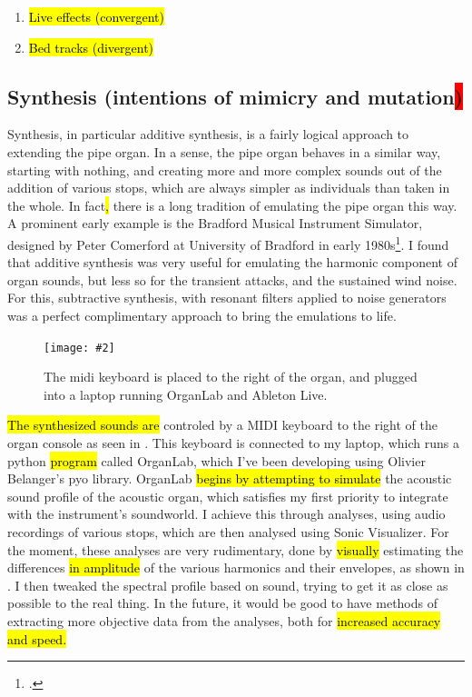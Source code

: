 \documentclass[12pt,twoside,maitrise]{dms_ks}
\newcommand{\customincludegraphics}[4][]{%
    \begin{figure}[H]
        \centering
        \texttt{[image: \#2]}
        \caption{#4}
	\label{#3} 
    \end{figure}
}
\theoremstyle{definition}
\begin{document}
{{\begin{enumerate}
  \item \hl{Live effects (convergent)}
  
  \item \hl{Bed tracks (divergent)}
\end{enumerate}

\subsection{Synthesis (intentions of mimicry and mutation\colorbox{red}{)}}

Synthesis, in particular additive synthesis, is a fairly logical approach to extending the pipe organ. 
In a sense, the pipe organ behaves in a similar way, starting with nothing, and creating more and more complex sounds out of the addition of various stops, which are always simpler as individuals than taken in the whole. 
In fact\hl{,} there is a long tradition of emulating the pipe organ this way. 
A prominent early example is the Bradford Musical Instrument Simulator, designed by Peter Comerford at University of Bradford in early 1980s\footcite[61]{comerford_simulating_1993}. 
I found that additive synthesis was very useful for emulating the harmonic component of organ sounds, but less so for the transient attacks, and the sustained wind noise. 
For this, subtractive synthesis, with resonant filters applied to noise generators was a perfect complimentary approach to bring the emulations to life.

\customincludegraphics[scale=0.065]{IMG_3414_copy.jpg}{fig:interface}{The midi keyboard is placed to the right of the organ, and plugged into a laptop running OrganLab and Ableton Live.}

\hl{The synthesized sounds are} controled by a MIDI keyboard to the right of the organ console as seen in . 
This keyboard is connected to my laptop, which runs a python \hl{program} called OrganLab, which I've been developing using Olivier Belanger's pyo library. 
OrganLab \hl{begins by attempting to simulate} the acoustic sound profile of the acoustic organ, which satisfies my first priority to integrate with the instrument's soundworld. 
I achieve this through analyses, using audio recordings of various stops, which are then analysed using Sonic Visualizer. 
For the moment, these analyses are very rudimentary, done  by \hl{visually} estimating the differences \hl{in amplitude }of the various harmonics and their envelopes, as shown in . 
I then tweaked the spectral profile based on sound, trying to get it as close as possible to the real thing. 
In the future, it would be good to have methods of extracting more objective data from the analyses, both for \hl{increased accuracy and speed.}

}}
\end{document}
